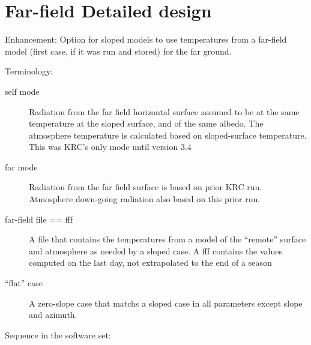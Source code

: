 
\section{Far-field Detailed design \label{fffd}}

Enhancement: Option for sloped models to use temperatures from a far-field model
(first case, if it was run and stored) for the far ground.

Terminology:
\begin{description}  %
\item [self mode] Radiation from the far field horizontal surface assumed to be
  at the same temperature at the sloped surface, and of the same albedo. The
  atmosphere temperature is calculated based on sloped-surface temperature. This
  was KRC's only mode until version 3.4
   
\item [far mode] Radiation from the far field surface is based on
  prior KRC run. Atmosphere down-going radiation also based on this prior run.

\item [far-field file == fff] A file that contains the temperatures from a model
  of the ``remote'' surface and atmosphere as needed by a sloped case. A fff
  contains the values computed on the last day, not extrapolated to the end of a
  season

\item [``flat'' case] A zero-slope case that matchs a sloped case in all
  parameters except slope and azimuth.

\end{description}

Sequence in the software set:

